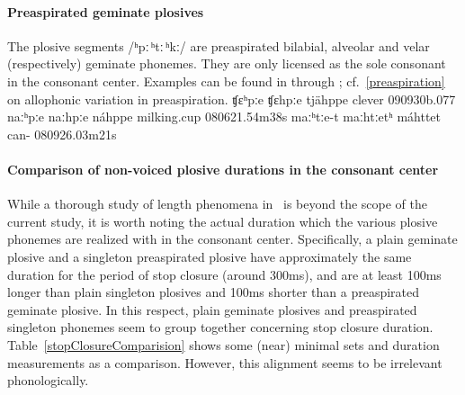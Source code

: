 \paragraph{Preaspirated geminate plosives}
The plosive segments \mbox{/ʰpː\,ʰtː\,ʰkː/} are preaspirated bilabial, alveolar and velar (respectively) geminate phonemes. 
They are only licensed as the sole consonant in the consonant center.  
Examples can be found in  through ; cf.~\SEC\ref{preaspiration} on allophonic variation in preaspiration. 
		{ʧɛ{ʰpː}e}		{ʧɛ{hpː}e}		{tjähppe}	{clever\BS{}}		{090930b}{.077}
	{naː{ʰpː}e}	{naː{hpː}e}	{náhppe}	{milking.cup\BS{}}	{080621}{.54m38s}
			{maː{ʰtː}e-t}	{maː{htː}etʰ}	{máhttet}	{can-}			{080926}{.03m21s}


\paragraph[Non-voiced plosive durations in the consonant center]{Comparison of non-voiced plosive durations in the consonant center}\label{plosiveDurationComparison}
While a thorough study of length phenomena in \PS\ is beyond the scope of the current study, it is worth noting the actual duration which the various plosive phonemes are realized with in the consonant center. %
Specifically, %
a plain geminate plosive and a singleton preaspirated plosive have approximately the same duration for the period of stop closure (around 300ms), and are at least 100ms longer than plain singleton plosives and 100ms shorter than a preaspirated geminate plosive. In this respect, plain geminate plosives and preaspirated singleton phonemes seem to group together concerning stop closure duration. 
Table~\vref{stopClosureComparision} %
shows some (near) minimal sets and duration measurements as a comparison. However, this alignment seems to be irrelevant phonologically. 

